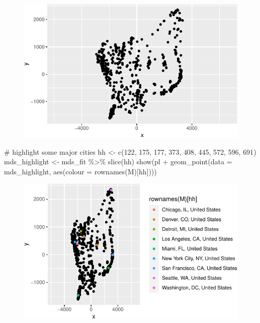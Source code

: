 \documentclass[
  letterpaper,
  DIV=11,
  numbers=noendperiod]{scrreprt}
\newenvironment{Shaded}{\begin{snugshade}}{\end{snugshade}}
\newcommand{\AttributeTok}[1]{\textcolor[rgb]{0.40,0.45,0.13}{#1}}
\newcommand{\CommentTok}[1]{\textcolor[rgb]{0.37,0.37,0.37}{#1}}
\newcommand{\DecValTok}[1]{\textcolor[rgb]{0.68,0.00,0.00}{#1}}
\newcommand{\FunctionTok}[1]{\textcolor[rgb]{0.28,0.35,0.67}{#1}}
\newcommand{\NormalTok}[1]{\textcolor[rgb]{0.00,0.23,0.31}{#1}}
\newcommand{\OtherTok}[1]{\textcolor[rgb]{0.00,0.23,0.31}{#1}}
\newcommand{\SpecialCharTok}[1]{\textcolor[rgb]{0.37,0.37,0.37}{#1}}
\begin{document}
\begin{figure}[H]

{\centering \includegraphics{./11-SVD_PCA_files/figure-pdf/unnamed-chunk-16-1.pdf}

}

\end{figure}

\begin{Shaded}
\begin{Highlighting}[]
\CommentTok{\# highlight some major cities}
\NormalTok{hh }\OtherTok{\textless{}{-}} \FunctionTok{c}\NormalTok{(}\DecValTok{122}\NormalTok{, }\DecValTok{175}\NormalTok{, }\DecValTok{177}\NormalTok{, }\DecValTok{373}\NormalTok{, }\DecValTok{408}\NormalTok{, }\DecValTok{445}\NormalTok{, }\DecValTok{572}\NormalTok{, }\DecValTok{596}\NormalTok{, }\DecValTok{691}\NormalTok{)}
\NormalTok{mds\_highlight }\OtherTok{\textless{}{-}}\NormalTok{ mds\_fit }\SpecialCharTok{\%\textgreater{}\%} \FunctionTok{slice}\NormalTok{(hh)}
\FunctionTok{show}\NormalTok{(pl }\SpecialCharTok{+} \FunctionTok{geom\_point}\NormalTok{(}\AttributeTok{data  =}\NormalTok{ mds\_highlight, }\FunctionTok{aes}\NormalTok{(}\AttributeTok{colour =} \FunctionTok{rownames}\NormalTok{(M)[hh])))}
\end{Highlighting}
\end{Shaded}

\begin{figure}[H]

{\centering \includegraphics{./11-SVD_PCA_files/figure-pdf/unnamed-chunk-16-2.pdf}

}

\end{figure}
\end{document}
